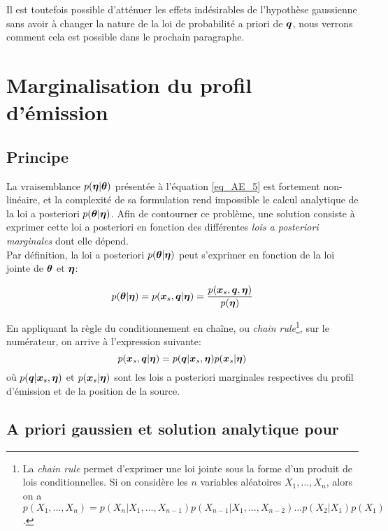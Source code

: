 Il est toutefois possible d'atténuer les effets indésirables de l'hypothèse gaussienne sans avoir à changer la nature de la loi de probabilité a priori de ${\bm{q}}$, nous verrons comment cela est possible dans le prochain paragraphe.


\section{Marginalisation du profil d'émission}

\subsection{Principe}
La vraisemblance $p({\bm{\eta}}|{\bm{\theta}})$ présentée à l'équation \eqref{eq_AE_5} est fortement non-linéaire, et la complexité de sa formulation rend impossible le calcul analytique de la loi a posteriori $p({\bm{\theta}} | {\bm{\eta}})$. Afin de contourner ce problème, une solution consiste à exprimer cette loi a posteriori en fonction des différentes \textit{lois a posteriori marginales} dont elle dépend. \\

Par définition, la loi a posteriori $p({\bm{\theta}}|{\bm{\eta}})$ peut s'exprimer en fonction de la loi jointe de ${\bm{\theta}}$ et ${\bm{\eta}}$:

\begin{equation}
p({\bm{\theta}}|{\bm{\eta}}) = p({\bm{x}_s}, {\bm{q}} | {\bm{\eta}}) = \dfrac{p({\bm{x}_s}, {\bm{q}}, {\bm{\eta}})}{p({\bm{\eta}})}
\label{eq_conditionalite}
\end{equation}

En appliquant la règle du conditionnement en chaîne, ou \textit{chain rule}\footnote{La \textit{chain rule} permet d'exprimer une loi jointe sous la forme d'un produit de lois conditionnelles. Si on considère les $n$ variables aléatoires $X_1, \dots, X_n$, alors on a $p(X_1, \dots, X_n) = p(X_n|X_1, \dots, X_{n-1})p(X_{n-1}|X_1, \dots, X_{n-2})\dots p(X_2|X_1)p(X_1)$.}, sur le numérateur, on arrive à l'expression suivante:
\begin{equation}
p({\bm{x}_s}, {\bm{q}} | {\bm{\eta}}) = p({\bm{q}} | {\bm{x}_s}, {\bm{\eta}})p({\bm{x}_s} | {\bm{\eta}})
\label{eq_AE_9}
\end{equation}
où $p({\bm{q}} | {\bm{x}_s}, {\bm{\eta}})$ et $p({\bm{x}_s} | {\bm{\eta}})$ sont les lois a posteriori marginales respectives du profil d'émission et de la position de la source. \\

\subsection{A priori gaussien et solution analytique pour}

